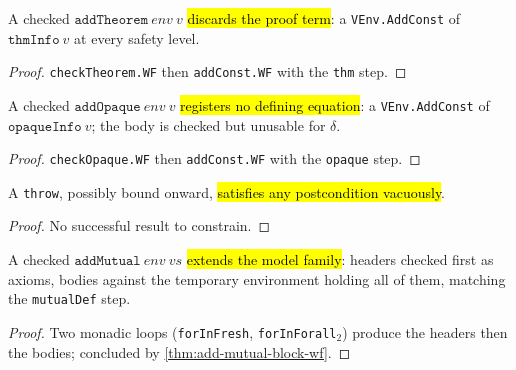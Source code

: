 \begin{lemma}
\label{thm:add-theorem-wf}
\leanok
{}

 A checked $\mathtt{addTheorem}\ env\ v$ \hl{discards the proof term}: a
\texttt{VEnv.AddConst} of $\mathtt{thmInfo}\ v$ at every safety level.
\end{lemma}
\begin{proof}
\leanok
{} \texttt{checkTheorem.WF} then \texttt{addConst.WF} with the \texttt{thm}
step.
\end{proof}

\begin{lemma}
\label{thm:add-opaque-wf}
\leanok
{}

 A checked $\mathtt{addOpaque}\ env\ v$ \hl{registers no defining equation}:
a \texttt{VEnv.AddConst} of $\mathtt{opaqueInfo}\ v$; the body is checked but unusable for
$\delta$.
\end{lemma}
\begin{proof}
\leanok
{} \texttt{checkOpaque.WF} then \texttt{addConst.WF} with the \texttt{opaque}
step.
\end{proof}

\begin{lemma}
\label{family:except-wf-throw}
\leanok
{}

 A \texttt{throw}, possibly bound onward, \hl{satisfies any postcondition
vacuously}.
\end{lemma}
\begin{proof}
\leanok
{} No successful result to constrain.
\end{proof}

\begin{lemma}
\label{thm:add-mutual-wf}
\leanok
{}

 A checked $\mathtt{addMutual}\ env\ vs$ \hl{extends the model family}:
headers checked first as axioms, bodies against the temporary environment holding all of
them, matching the \texttt{mutualDef} step.
\end{lemma}
\begin{proof}
\leanok
{} Two monadic loops (\texttt{forInFresh}, \texttt{forInForall}$_2$) produce the
headers then the bodies; concluded by \ref{thm:add-mutual-block-wf}.
\end{proof}

